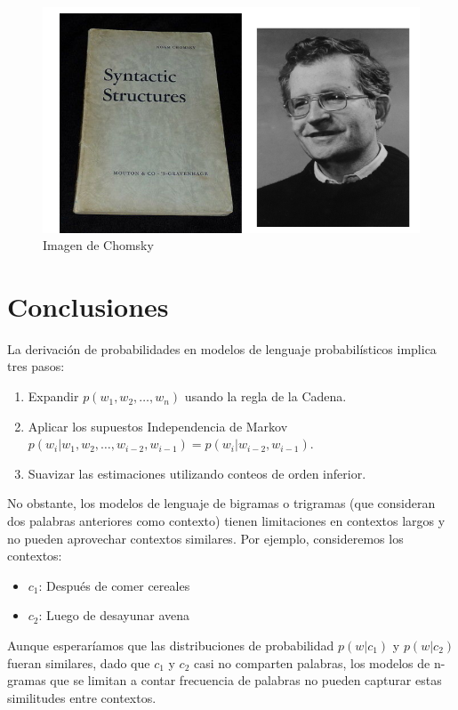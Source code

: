 \begin{figure}[h]
    \centering
    \includegraphics[scale = 0.4]{pics/chomsky.png}
    \caption{Imagen de Chomsky}
    \label{fig:chomsky}
\end{figure}


\section{Conclusiones}
La derivación de probabilidades en modelos de lenguaje probabilísticos implica tres pasos:
    \begin{enumerate}
        \item Expandir $p(w_1, w_2, \ldots, w_n)$ usando la regla de la Cadena.
        \item Aplicar los supuestos Independencia de Markov \\
        $p(w_i | w_1, w_2, \ldots, w_{i-2}, w_{i-1}) = p(w_i | w_{i-2}, w_{i-1})$.
        \item Suavizar las estimaciones utilizando conteos de orden inferior.
    \end{enumerate}
    
No obstante, los modelos de lenguaje de bigramas o trigramas (que consideran dos palabras anteriores como contexto) tienen limitaciones en contextos largos y no pueden aprovechar contextos similares. Por ejemplo, consideremos los contextos:
\begin{itemize}
 \item $c_1$: Después de comer cereales
\item  $c_2$: Luego de desayunar avena 
\end{itemize}

Aunque esperaríamos que las distribuciones de probabilidad $p(w|c_1)$ y $p(w|c_2)$ fueran similares, dado que $c_1$ y $c_2$ casi no comparten palabras, los modelos de n-gramas que se limitan a contar frecuencia de palabras no pueden capturar estas similitudes entre contextos.
    
